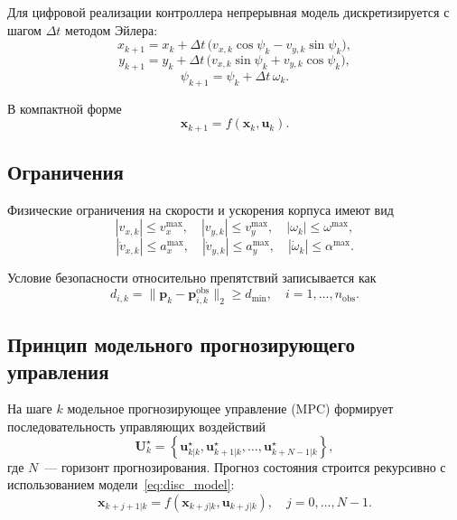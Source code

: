 Для цифровой реализации контроллера непрерывная модель дискретизируется
с шагом $\Delta t$ методом Эйлера:
\begin{equation}
x_{k+1} = x_k + \Delta t\,\bigl(v_{x,k}\cos\psi_k - v_{y,k}\sin\psi_k\bigr),
\label{eq:disc_x}
\end{equation}
\begin{equation}
y_{k+1} = y_k + \Delta t\,\bigl(v_{x,k}\sin\psi_k + v_{y,k}\cos\psi_k\bigr),
\label{eq:disc_y}
\end{equation}
\begin{equation}
\psi_{k+1} = \psi_k + \Delta t\,\omega_k.
\label{eq:disc_psi}
\end{equation}

В компактной форме
\begin{equation}
\mathbf{x}_{k+1} = f(\mathbf{x}_k, \mathbf{u}_k).
\label{eq:disc_model}
\end{equation}

\subsection{Ограничения}

Физические ограничения на скорости и ускорения корпуса имеют вид
\begin{equation}
|v_{x,k}| \le v_x^{\max},\quad |v_{y,k}| \le v_y^{\max},\quad |\omega_k| \le \omega^{\max},
\label{eq:vel_limits}
\end{equation}
\begin{equation}
|\dot{v}_{x,k}| \le a_x^{\max},\quad |\dot{v}_{y,k}| \le a_y^{\max},\quad |\dot{\omega}_k| \le \alpha^{\max}.
\label{eq:acc_limits}
\end{equation}

Условие безопасности относительно препятствий записывается как
\begin{equation}
d_{i,k} = \|\mathbf{p}_k - \mathbf{p}^{\text{obs}}_{i,k}\|_2 \ge d_{\min},
\quad i = 1,\dots,n_{\text{obs}}.
\label{eq:safety_constraint}
\end{equation}

\subsection{Принцип модельного прогнозирующего управления}

На шаге $k$ модельное прогнозирующее управление (MPC) формирует
последовательность управляющих воздействий
\begin{equation}
\mathbf{U}_k^{\star} =
\left\{
\mathbf{u}_{k|k}^{\star},
\mathbf{u}_{k+1|k}^{\star},
\dots,
\mathbf{u}_{k+N-1|k}^{\star}
\right\},
\label{eq:mpc_sequence}
\end{equation}
где $N$~--- горизонт прогнозирования. Прогноз состояния строится
рекурсивно с использованием модели~\eqref{eq:disc_model}:
\begin{equation}
\mathbf{x}_{k+j+1|k} = f(\mathbf{x}_{k+j|k}, \mathbf{u}_{k+j|k}),
\quad j = 0,\dots,N-1.
\label{eq:mpc_rollout}
\end{equation}

